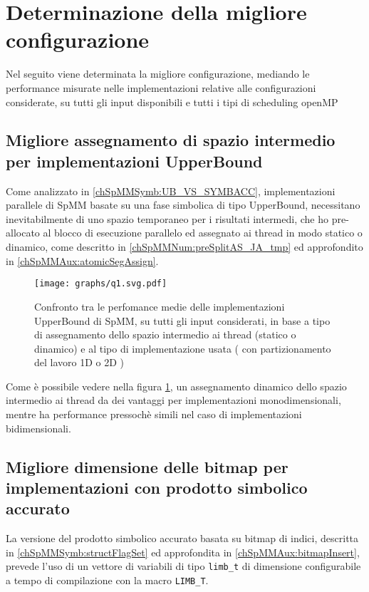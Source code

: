 \section{Determinazione della migliore configurazione}	\label{bestConf}
Nel seguito viene determinata la migliore configurazione, mediando le performance misurate nelle implementazioni relative alle configurazioni considerate,
su tutti gli input disponibili e tutti i tipi di scheduling openMP

\subsection[Migliore assegnamento di spazio intermedio per\\implementazioni UpperBound]
{Migliore assegnamento di spazio intermedio per implementazioni UpperBound}
Come analizzato in \ref{chSpMMSymb:UB_VS_SYMBACC}, implementazioni parallele di SpMM basate su una fase simbolica di tipo UpperBound,
necessitano inevitabilmente di uno spazio temporaneo per i risultati intermedi, 
che ho pre-allocato al blocco di esecuzione parallelo 
ed assegnato ai thread in modo statico o dinamico, 
come descritto in \ref{chSpMMNum:preSplitAS_JA_tmp} ed approfondito in \ref{chSpMMAux:atomicSegAssign}.\\

\begin{figure}[H]
  \centering \texttt{[image: graphs/q1.svg.pdf]}
  \caption[UB: confronto assegnamento spazio temporaneo]
  {Confronto tra le perfomance medie delle implementazioni UpperBound di SpMM, su tutti gli input considerati, in base a
		tipo di assegnamento dello spazio intermedio ai thread (statico o dinamico) e al tipo di implementazione usata 
		( con partizionamento del lavoro 1D o 2D ) }
  \decoRule \label{fig:q1}
\end{figure}

Come è possibile vedere nella figura \ref{fig:q1}, un assegnamento dinamico dello spazio intermedio ai thread da dei vantaggi
per implementazioni monodimensionali, mentre ha performance pressochè simili nel caso di implementazioni bidimensionali.\\

\subsection{Migliore dimensione delle bitmap per implementazioni con prodotto simbolico accurato}
La versione del prodotto simbolico accurato basata su bitmap di indici, descritta in \ref{chSpMMSymb:structFlagSet} 
ed approfondita in \ref{chSpMMAux:bitmapInsert}, prevede l'uso di un vettore di variabili di tipo \verb|limb_t|
di dimensione configurabile a tempo di compilazione con la macro \verb|LIMB_T|.\\

